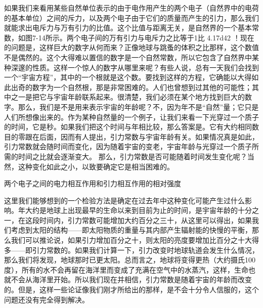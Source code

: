 \documentclass[12pt,oneside]{book}
\begin{document}
\begin{common-format}
如果我们来看用某些自然单位表示的由于电作用产生的两个电子（自然界中的电荷的基本单位）之间的斥力，以及两个电子由于它们的质量而产生的引力，那么我们就能求出电斥力与万有引力的比值。这个比值与距离无关，是自然界的一个基本常数，如图7-14所示。两个电子间的万有引力与电斥力之比等于1比 \num{4.17d42} ！现在的问题是，这样巨大的数字从何而来？正像地球与跳蚤的体积之比那样，这个数值不是偶然的。这个大得难以置信的数字是一个自然常数，所以它包含了自然界中某种深邃的性质。这样一个惊人的数字从哪里来呢？有些人说，总有一天我们会找到一个“宇宙方程”，其中的一个根就是这个数。要找到这样的方程，它确能以大得如此出奇的数字为一个自然根，那是非常困难的。人们也曾想到过其他的可能性；其中之一是把它与宇宙年龄联系起来。很清楚，我们必须在某个地方找到巨大的数字。那么，我们是不是用来表示宇宙的年龄呢？不，因为年不是“自然”量；它只是人们所想像出来的。作为某种自然量的一个例子，让我们来看一下光穿过一个质子的时间，它是秒。如果我们把这个时间与年相比较，那么答案是。它有大约相同数目的零跟在后面，因而有人提出，引力常数与宇宙年龄有关。如果情况真是如此，引力常数就会随时间而变化，因为随着宇宙的变老，宇宙年龄与光穿过一个质子所需的时间之比就会逐渐变大。
那么，引力常数是否可能随着时间发生变化呢？当然，这种变化如此之小，以致要确定它是相当困难的。
\begin{linefig}{两个电子之间的电力相互作用和引力相互作用的相对强度}
\caption{两个电子之间的电力相互作用和引力相互作用的相对强度}
\label{fig:两个电子之间的电力相互作用和引力相互作用的相对强度}
\end{linefig}

这里我们能够想到的一个检验方法是确定在过去年中这种变化可能产生过什么影响。年大约是地球上出现最早的生命以来到目前为止的时间，是宇宙年龄的十分之一，在这段时间内，引力常数可能增加大约百分之三十，从这里可以得出，如果我们考虑到太阳的结构——即太阳物质的重量与其内部产生辐射能的快慢的平衡，那么我们可以推论说，如果引力增加百分之十，则太阳的亮度要增加比百分之十大得多——即引力常数的。如果我们计算一下，引力改变时地球轨道会发生什么情况，那么我们将发现，地球那时已更太阳。总而言之，地球将变得更热（大约摄氏100度），所有的水不会再留在海洋里而变成了充满在空气中的水蒸汽，这样，生命也就不会从海洋里开始。所以我们现在并相信，引力常数是随着宇宙的年龄而改变的。但是，这样一些论证像我们刚才所给出的那样，是不会十分令人信服的，这个问题还没有完全得到解决。


\end{common-format}
\end{document}

